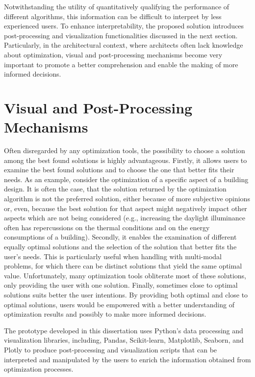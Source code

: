 Notwithstanding the utility of quantitatively qualifying the performance of different algorithms, this information can be difficult to interpret by less experienced users. To enhance interpretability, the proposed solution introduces post-processing and visualization functionalities discussed in the next section. Particularly, in the architectural context, where architects often lack knowledge about optimization, visual and post-processing mechanisms become very important to promote a better comprehension and enable the making of more informed decisions. 

\section{Visual and Post-Processing Mechanisms}

Often disregarded by any optimization tools, the possibility to choose a solution among the best found solutions is highly advantageous. Firstly, it allows users to examine the best found solutions and to choose the one that better fits their needs. As an example, consider the optimization of a specific aspect of a building design. It is often the case, that the solution returned by the optimization algorithm is not the preferred solution, either because of more subjective opinions or, even, because the best solution for that aspect might negatively impact other aspects which are not being considered (e.g., increasing the daylight illuminance often has repercussions on the thermal conditions and on the energy consumptions of a building). Secondly, it enables the examination of different equally optimal solutions and the selection of the solution that better fits the user's needs. This is particularly useful when handling with multi-modal problems, for which there can be distinct solutions that yield the same optimal value. Unfortunately, many optimization tools obliterate most of these solutions, only providing the user with one solution. Finally, sometimes close to optimal solutions suits better the user intentions. By providing both optimal and close to optimal solutions, users would be empowered with a better understanding of optimization results and possibly to make more informed decisions. 

The prototype developed in this dissertation uses Python's data processing and visualization libraries, including, Pandas, Scikit-learn, Matplotlib, Seaborn, and Plotly to produce post-processing and visualization scripts that can be interpreted and manipulated by the users to enrich the information obtained from optimization processes. 

